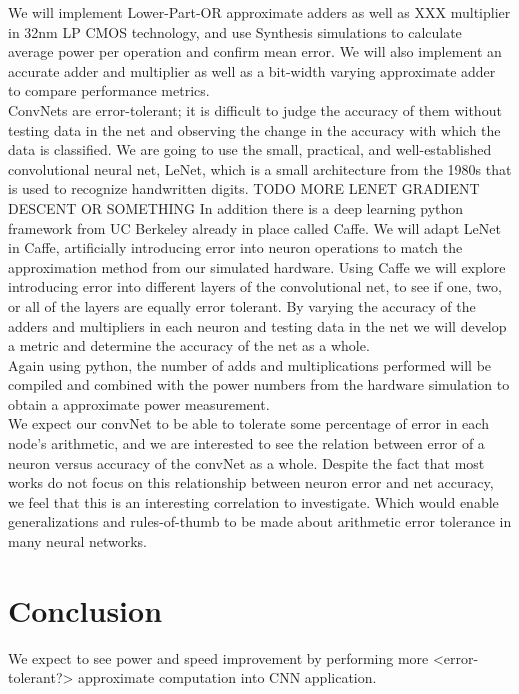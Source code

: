 \documentclass[conference]{IEEEtran}
\begin{document}
	\indent We will implement Lower-Part-OR approximate adders as well as XXX multiplier in 32nm LP CMOS technology, and use Synthesis simulations to calculate average power per operation and confirm mean error. We will also implement an accurate adder and multiplier as well as a  bit-width varying approximate adder to compare performance metrics.\\

	\indent ConvNets are error-tolerant; it is difficult to judge the accuracy of them without testing data in the net and observing the change in  the accuracy with which the data is classified. We are going to use the small, practical, and well-established convolutional neural net, LeNet, which is a small architecture from the 1980s that is used to recognize handwritten digits. TODO MORE LENET GRADIENT DESCENT OR SOMETHING In addition there is a deep learning python framework from UC Berkeley already in place called Caffe. We will adapt LeNet in Caffe, artificially introducing error into neuron operations to match the approximation method from our simulated hardware. Using Caffe we will explore introducing error into different layers of the convolutional net, to see if one, two, or all of the layers are equally error tolerant. By varying the accuracy of the adders and multipliers in each neuron and testing data in the net we will develop a metric and determine the accuracy of the net as a whole.\\

	\indent Again using python, the number of adds and multiplications performed will be compiled and combined with the power numbers from the hardware simulation to obtain a approximate power measurement. \\

	\indent We expect our convNet to be able to tolerate some percentage of error in each node's arithmetic, and we are interested to see the relation between error of a neuron versus accuracy of the convNet as a whole. Despite the fact that most works do not focus on this relationship between neuron error and net accuracy, we feel that this is an interesting correlation to investigate. Which would enable generalizations and rules-of-thumb to be made about arithmetic error tolerance in many neural networks.\\
	

\section{Conclusion}
We expect to see power and speed improvement by performing more <error-tolerant?> approximate computation into CNN application.
\end{document}
